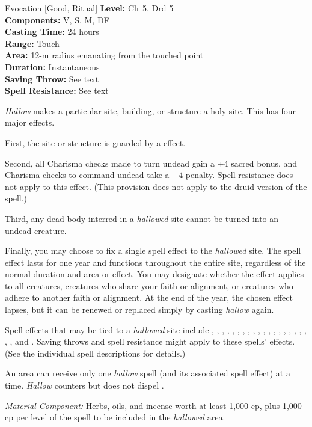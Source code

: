 {Evocation [Good, Ritual]}
{
	\textbf{Level:}
	Clr 5, Drd 5\\
	\textbf{Components:}
	V, S, M, DF\\
	\textbf{Casting Time:}
	24 hours\\
	\textbf{Range:}
	Touch\\
	\textbf{Area:}
	12-m radius emanating from the touched point\\
	\textbf{Duration:}
	Instantaneous\\
	\textbf{Saving Throw:}
	See text\\
	\textbf{Spell Resistance:}
	See text\\
}
{
	\emph{Hallow} makes a particular site, building, or structure a holy site. This has four major effects.

	First, the site or structure is guarded by a  effect.

	Second, all Charisma checks made to turn undead gain a +4 sacred bonus, and Charisma checks to command undead take a $-4$ penalty. Spell resistance does not apply to this effect. (This provision does not apply to the druid version of the spell.)

	Third, any dead body interred in a \emph{hallowed} site cannot be turned into an undead creature.

	Finally, you may choose to fix a single spell effect to the \emph{hallowed} site. The spell effect lasts for one year and functions throughout the entire site, regardless of the normal duration and area or effect. You may designate whether the effect applies to all creatures, creatures who share your faith or alignment, or creatures who adhere to another faith or alignment. At the end of the year, the chosen effect lapses, but it can be renewed or replaced simply by casting \emph{hallow} again.

	Spell effects that may be tied to a \emph{hallowed} site include , , , , , , , , , , , , , , , , , , , , , and . Saving throws and spell resistance might apply to these spells' effects. (See the individual spell descriptions for details.)

	An area can receive only one \emph{hallow} spell (and its associated spell effect) at a time. \emph{Hallow} counters but does not dispel .

	\textit{Material Component:}
	Herbs, oils, and incense worth at least 1,000 cp, plus 1,000 cp per level of the spell to be included in the \emph{hallowed} area.

}
